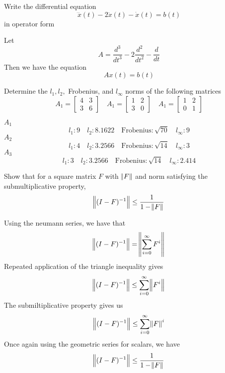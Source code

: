 \documentclass{homework}
\begin{document}
\begin{problem}
  Write the differential equation
  \[\dddot{x}(t) - 2\ddot{x}(t) - \dot{x}(t) = b(t)\]
  in operator form
\end{problem}

\begin{solution}
  Let 
  \[ A = \frac{d^3}{dt^3} - 2 \frac{d^2}{dt^2} - \frac{d}{dt} \]
  Then we have the equation
  \[ Ax(t) = b(t)\]
\end{solution}

\begin{problem}
  Determine the $l_1,l_2,$ Frobenius, and $l_{\infty}$ norms of the following matrices
  \[ A_1 =
    \begin{bmatrix}
      4 & 3 \\
      3 & 6
    \end{bmatrix}
    \quad 
    A_1 =
    \begin{bmatrix}
      1 & 2 \\
      3 & 0
    \end{bmatrix}
    \quad
    A_1 =
    \begin{bmatrix}
      1 & 2 \\
      0 & 1
    \end{bmatrix}
  \]
\end{problem}

\begin{solution}
  $A_1$
  \[ l_1: 9 \quad l_2: 8.1622 \quad \text{Frobenius}: \sqrt{70} \quad l_\infty: 9\]
  $A_2$
  \[ l_1: 4 \quad l_2: 3.2566 \quad \text{Frobenius}: \sqrt{14} \quad l_\infty: 3\]
  $A_3$
  \[ l_1: 3 \quad l_2: 3.2566 \quad \text{Frobenius}: \sqrt{14} \quad l_\infty: 2.414\]
\end{solution}

\begin{problem}
  Show that for a square matrix $F$ with $\norm{F}$ and norm satisfying the submultiplicative property,
 \[ \norm{(I - F)^{-1}} \leq \frac{1}{1 - \norm{F}} \]
\end{problem}

\begin{solution}
  Using the neumann series, we have that 
  \[ \norm{(I-F)^{-1}} = \norm{ \sum^{\infty}_{i=0} F^i} \]
  Repeated application of the triangle inequality gives
  \[ \norm{(I-F)^{-1}} \leq \sum^{\infty}_{i=0} \norm{F^i} \]
  The submiltiplicative property gives us
  \[ \norm{(I-F)^{-1}} \leq \sum^{\infty}_{i=0} \norm{F}^i \]
  Once again using the geometric series for scalars, we have
  \[ \norm{(I-F)^{-1}} \leq \frac{1}{1 - \norm{F}} \]
\end{solution}
\end{document}
